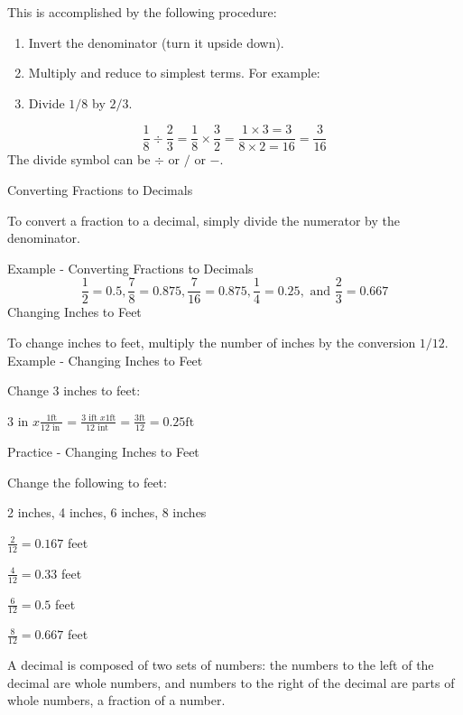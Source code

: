 This is accomplished by the following procedure:

\begin{enumerate}
  \item Invert the denominator (turn it upside down).

  \item Multiply and reduce to simplest terms. For example:

  \item Divide $1 / 8$ by $2 / 3$.

\end{enumerate}
$$
\frac{1}{8} \div \frac{2}{3}=\frac{1}{8} \times \frac{3}{2}=\frac{1 \times 3=3}{8 \times 2=16}=\frac{3}{16}
$$
The divide symbol can be $\div$ or $/$ or $-$.

Converting Fractions to Decimals

To convert a fraction to a decimal, simply divide the numerator by the denominator.

Example - Converting Fractions to Decimals
$$
\frac{1}{2}=0.5, \frac{7}{8}=0.875, \frac{7}{16}=0.875, \frac{1}{4}=0.25, \text { and } \frac{2}{3}=0.667
$$
Changing Inches to Feet

To change inches to feet, multiply the number of inches by the conversion $1 / 12$. Example - Changing Inches to Feet

Change 3 inches to feet:

3 in $x \frac{1 \mathrm{ft}}{12 \text { in }}=\frac{3 \text { ift } x 1 \mathrm{ft}}{12 \text { int }}=\frac{3 \mathrm{ft}}{12}=0.25 \mathrm{ft}$

Practice - Changing Inches to Feet

Change the following to feet:

2 inches, 4 inches, 6 inches, 8 inches

$\frac{2}{12}=0.167$ feet

$\frac{4}{12}=0.33$ feet

$\frac{6}{12}=0.5$ feet

$\frac{8}{12}=0.667$ feet

A decimal is composed of two sets of numbers: the numbers to the left of the decimal are whole numbers, and numbers to the right of the decimal are parts of whole numbers, a fraction of a number.\\


